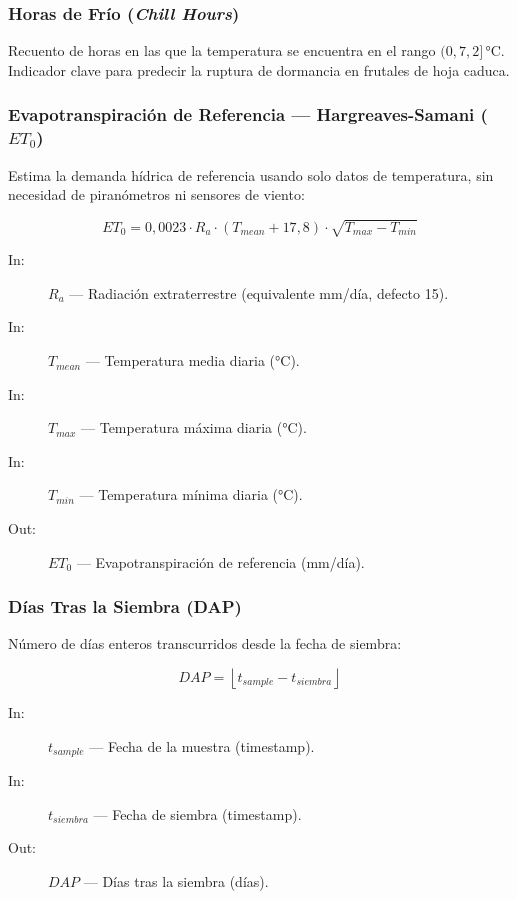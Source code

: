 \subsubsection{Horas de Frío (\textit{Chill Hours})}

Recuento de horas en las que la temperatura se encuentra en el rango $(0, 7{,}2]$\,°C.
Indicador clave para predecir la ruptura de dormancia en frutales de hoja caduca.

\subsubsection{Evapotranspiración de Referencia — Hargreaves-Samani ($ET_0$)}

Estima la demanda hídrica de referencia usando solo datos de temperatura, sin
necesidad de piranómetros ni sensores de viento:

\[
ET_0 = 0{,}0023 \cdot R_a \cdot (T_{mean} + 17{,}8) \cdot \sqrt{T_{max} - T_{min}}
\]

\begin{description}
        \item [In:] $R_a$ — Radiación extraterrestre (equivalente mm/día, defecto 15).
    \item [In:] $T_{mean}$ — Temperatura media diaria (°C).
    \item [In:] $T_{max}$ — Temperatura máxima diaria (°C).
    \item [In:] $T_{min}$ — Temperatura mínima diaria (°C).
    \item [Out:] $ET_0$ — Evapotranspiración de referencia (mm/día).
\end{description}

\subsubsection{Días Tras la Siembra (DAP)}

Número de días enteros transcurridos desde la fecha de siembra:

\[
DAP = \left\lfloor t_{sample} - t_{siembra} \right\rfloor
\]

\begin{description}
        \item [In:] $t_{sample}$ — Fecha de la muestra (timestamp).
    \item [In:] $t_{siembra}$ — Fecha de siembra (timestamp).
    \item [Out:] $DAP$ — Días tras la siembra (días).
\end{description}

